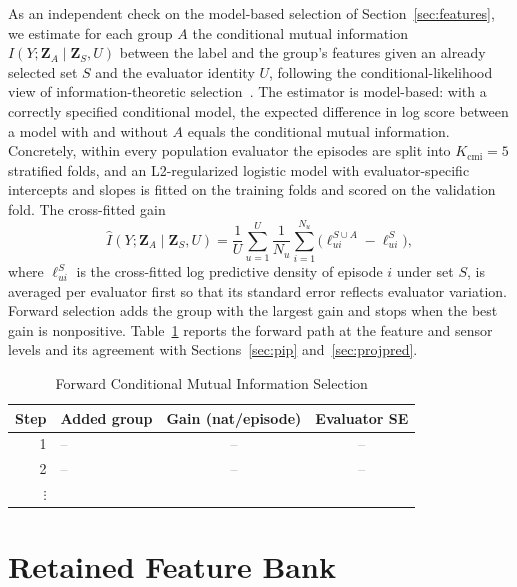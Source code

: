 \documentclass[lettersize,journal]{IEEEtran}
\newif\ifdraftnotes
\newcommand{\draftnote}[1]{\ifdraftnotes\textcolor{red}{\textbf{[TODO: #1]}}\fi}
\newcommand{\tbd}{\textcolor{gray}{--}}
\begin{document}
As an independent check on the model-based selection of Section~\ref{sec:features}, we estimate for each group $A$ the conditional mutual information $I(Y;\bm Z_A\mid\bm Z_S,U)$ between the label and the group's features given an already selected set $S$ and the evaluator identity $U$, following the conditional-likelihood view of information-theoretic selection~\cite{brown2012conditional}. The estimator is model-based: with a correctly specified conditional model, the expected difference in log score between a model with and without $A$ equals the conditional mutual information. Concretely, within every population evaluator the episodes are split into $K_{\mathrm{cmi}}=5$ stratified folds, and an L2-regularized logistic model with evaluator-specific intercepts and slopes is fitted on the training folds and scored on the validation fold. The cross-fitted gain
\begin{equation}
 \widehat I(Y;\bm Z_A\mid\bm Z_S,U)=\frac{1}{U}\sum_{u=1}^{U}\frac{1}{N_u}\sum_{i=1}^{N_u}
 \big(\ell^{S\cup A}_{ui}-\ell^{S}_{ui}\big),
 \label{eq:cmi}
\end{equation}
where $\ell^{S}_{ui}$ is the cross-fitted log predictive density of episode $i$ under set $S$, is averaged per evaluator first so that its standard error reflects evaluator variation. Forward selection adds the group with the largest gain and stops when the best gain is nonpositive. Table~\ref{tab:cmi} reports the forward path at the feature and sensor levels and its agreement with Sections~\ref{sec:pip} and~\ref{sec:projpred}. \draftnote{The conditional-MI check was not part of the confirmatory runs. Either run it against the frozen folds or drop this appendix before submission.}

\begin{table}[t]
\caption{Forward Conditional Mutual Information Selection}
\label{tab:cmi}
\centering
\setlength{\tabcolsep}{4pt}
\begin{tabular}{rlcc}
\toprule
Step & Added group & Gain (nat/episode) & Evaluator SE \\
\midrule
1 & \tbd & \tbd & \tbd \\
2 & \tbd & \tbd & \tbd \\
$\vdots$ & & & \\
\bottomrule
\end{tabular}
\end{table}

\section{Retained Feature Bank}
\label{app:bank}
\end{document}
